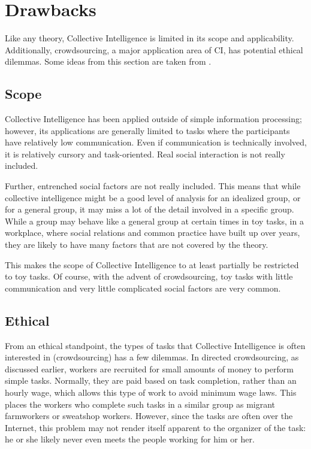 \section{Drawbacks}
Like any theory, Collective Intelligence is limited in its scope and applicability. Additionally, crowdsourcing, a major application area of CI, has potential ethical dilemmas. Some ideas from this section are taken from \cite{crowdsourcing}. 

\subsection{Scope}

Collective Intelligence has been applied outside of simple information processing; however, its applications are generally limited to tasks where the participants have relatively low communication. Even if communication is technically involved, it is relatively cursory and task-oriented. Real social interaction is not really included.

Further, entrenched social factors are not really included. This means that while collective intelligence might be a good level of analysis for an idealized group, or for a general group, it may miss a lot of the detail involved in a specific group. While a group may behave like a general group at certain times in toy tasks, in a workplace, where social relations and common practice have built up over years, they are likely to have many factors that are not covered by the theory. 

This makes the scope of Collective Intelligence to at least partially be restricted to toy tasks. Of course, with the advent of crowdsourcing, toy tasks with little communication and very little complicated social factors are very common. 

\subsection{Ethical}

From an ethical standpoint, the types of tasks that Collective Intelligence is often interested in (crowdsourcing) has a few dilemmas. In directed crowdsourcing, as discussed earlier, workers are recruited for small amounts of money to perform simple tasks. Normally, they are paid based on task completion, rather than an hourly wage, which allows this type of work to avoid minimum wage laws. This places the workers who complete such tasks in a similar group as migrant farmworkers or sweatshop workers. However, since the tasks are often over the Internet, this problem may not render itself apparent to the organizer of the task: he or she likely never even meets the people working for him or her. 

